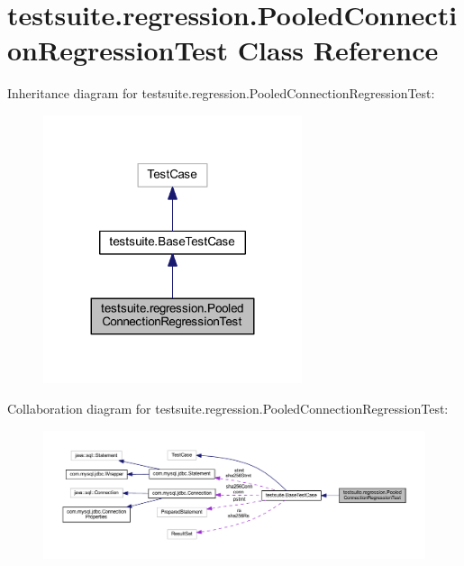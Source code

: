 \hypertarget{classtestsuite_1_1regression_1_1_pooled_connection_regression_test}{}\section{testsuite.\+regression.\+Pooled\+Connection\+Regression\+Test Class Reference}
\label{classtestsuite_1_1regression_1_1_pooled_connection_regression_test}


Inheritance diagram for testsuite.\+regression.\+Pooled\+Connection\+Regression\+Test\+:
\nopagebreak
\begin{figure}[H]
\begin{center}
\leavevmode
\includegraphics[width=215pt]{classtestsuite_1_1regression_1_1_pooled_connection_regression_test__inherit__graph}
\end{center}
\end{figure}


Collaboration diagram for testsuite.\+regression.\+Pooled\+Connection\+Regression\+Test\+:
\nopagebreak
\begin{figure}[H]
\begin{center}
\leavevmode
\includegraphics[width=350pt]{classtestsuite_1_1regression_1_1_pooled_connection_regression_test__coll__graph}
\end{center}
\end{figure}
